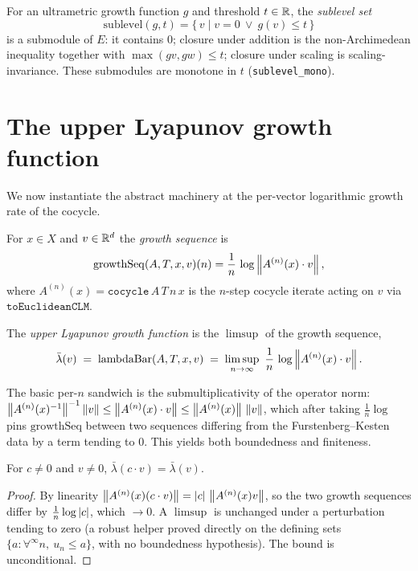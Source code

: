 \begin{definition}\label{sublevel}
  \leanok
  For an ultrametric growth function $g$ and threshold $t\in\mathbb{R}$, the
  \emph{sublevel set}
  \[ \mathrm{sublevel}(g,t) = \{\, v \mid v=0 \ \lor\ g(v)\le t \,\} \]
  is a submodule of $E$: it contains $0$; closure under addition is the
  non-Archimedean inequality together with $\max(g v,g w)\le t$; closure under
  scaling is scaling-invariance. These submodules are monotone in $t$
  (\texttt{sublevel\_mono}).
\end{definition}

\section{The upper Lyapunov growth function}

We now instantiate the abstract machinery at the per-vector logarithmic growth
rate of the cocycle.

\begin{definition}\label{growthSeq}
  For $x\in X$ and $v\in\mathbb{R}^d$ the \emph{growth sequence} is
  \[ \mathrm{growthSeq}(A,T,x,v)(n)
     = \frac1n\,\log\left\lVert A^{(n)}(x)\cdot v \right\rVert, \]
  where $A^{(n)}(x)=\mathtt{cocycle}\,A\,T\,n\,x$ is the $n$-step cocycle iterate
  acting on $v$ via $\mathtt{toEuclideanCLM}$.
\end{definition}

\begin{definition}\label{lambdaBar}
  \leanok
  The \emph{upper Lyapunov growth function} is the $\limsup$ of the growth
  sequence,
  \[ \bar\lambda(v) \;=\; \mathrm{lambdaBar}(A,T,x,v)
     \;=\; \limsup_{n\to\infty}\ \frac1n\,\log\left\lVert A^{(n)}(x)\cdot v \right\rVert. \]
\end{definition}

The basic per-$n$ sandwich is the submultiplicativity of the operator norm:
$\left\lVert A^{(n)}(x)^{-1} \right\rVert^{-1}\left\lVert v \right\rVert \le \left\lVert A^{(n)}(x)\cdot v \right\rVert
\le \left\lVert A^{(n)}(x) \right\rVert\,\left\lVert v \right\rVert$, which after taking $\tfrac1n\log$ pins
$\mathrm{growthSeq}$ between two sequences differing from the Furstenberg--Kesten
data by a term tending to $0$. This yields both boundedness and finiteness.

\begin{lemma}\label{lambdaBar_smul}
  \leanok
  For $c\neq 0$ and $v\neq 0$, $\bar\lambda(c\cdot v)=\bar\lambda(v)$.
  \begin{proof}\leanok
  By linearity $\left\lVert A^{(n)}(x)(c\cdot v) \right\rVert=\left\lvert c \right\rvert\,\left\lVert A^{(n)}(x)v \right\rVert$, so the
  two growth sequences differ by $\tfrac1n\log\left\lvert c \right\rvert$, which $\to 0$. A
  $\limsup$ is unchanged under a perturbation tending to zero (a robust helper
  proved directly on the defining sets $\{a:\forall^{\infty} n,\ u_n\le a\}$, with
  no boundedness hypothesis). The bound is unconditional.
  \end{proof}
\end{lemma}

